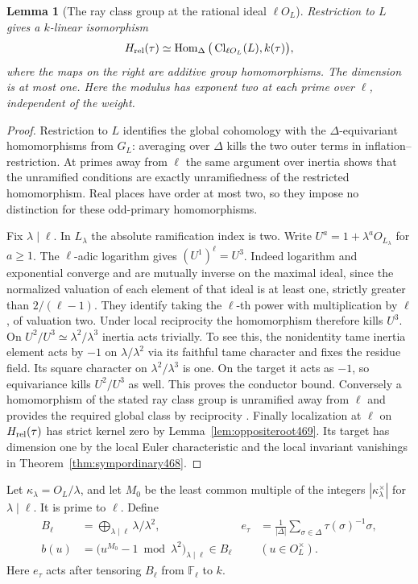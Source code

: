 \documentclass[a4paper,11pt]{article}
\newtheorem{lemma}[proposition]{Lemma}
\theoremstyle{definition}
\theoremstyle{remark}
\numberwithin{equation}{section}
\newcommand{\Cl}{\operatorname{Cl}}
\begin{document}
\begin{lemma}[The ray class group at the rational ideal \(\ell O_L\)]\leavevmode
\label{lem:rayconductor472}
Restriction to \(L\) gives a \(k\)-linear isomorphism
\[
 H_{\rm rel}(\tau)\simeq
   \operatorname{Hom}_{\Delta}\big(\Cl_{\ell O_L}(L),k(\tau)\big),
\]
where the maps on the right are additive group homomorphisms.
The dimension is at most one. Here the modulus has exponent
two at each prime over \(\ell\), independent of the weight.
\end{lemma}
\begin{proof}
Restriction to \(L\) identifies the global cohomology with the
\(\Delta\)-equivariant homomorphisms from \(G_L\): averaging over
\(\Delta\) kills the two outer terms in inflation--restriction.
At primes away from \(\ell\) the same argument over inertia shows
that the unramified conditions are exactly unramifiedness of the
restricted homomorphism. Real places have order at most two, so
they impose no distinction for these odd-primary homomorphisms.

Fix \(\lambda\mid\ell\). In \(L_\lambda\) the absolute
ramification index is two. Write \(U^a=1+\lambda^a O_{L_\lambda}\)
for \(a\ge1\). The \(\ell\)-adic logarithm gives
\((U^1)^\ell=U^3\). Indeed logarithm and exponential converge and
are mutually inverse on the maximal ideal, since the normalized
valuation of each element of that ideal is at least one, strictly
greater than \(2/(\ell-1)\). They identify taking the \(\ell\)-th
power with multiplication by \(\ell\), of valuation two.
Under local reciprocity the homomorphism therefore kills \(U^3\).
On \(U^2/U^3\simeq\lambda^2/\lambda^3\) inertia acts trivially.
To see this, the nonidentity tame inertia element acts by \(-1\)
on \(\lambda/\lambda^2\) via its faithful tame character and
fixes the residue field. Its square character on
\(\lambda^2/\lambda^3\) is one. On the target it acts as \(-1\),
so equivariance kills \(U^2/U^3\) as well. This proves the
conductor bound. Conversely a homomorphism of the stated ray
class group is unramified away from \(\ell\) and provides the
required global class by reciprocity \cite{XI-VIII-rayclass444}. Finally
localization at \(\ell\) on \(H_{\rm rel}(\tau)\) has strict
kernel zero by Lemma~\ref{lem:oppositeroot469}. Its target has
dimension one by the local Euler characteristic and the local
invariant vanishings in Theorem~\ref{thm:sympordinary468}.
\end{proof}

Let \(\kappa_\lambda=O_L/\lambda\), and let \(M_0\) be the least
common multiple of the integers \(|\kappa_\lambda^\times|\) for
\(\lambda\mid\ell\). It is prime to \(\ell\). Define
\[
 \begin{aligned}
 B_\ell&=\bigoplus_{\lambda\mid\ell}\lambda/\lambda^2,
 &e_\tau&=\frac{1}{|\Delta|}\sum_{\sigma\in\Delta}
                                  \tau(\sigma)^{-1}\sigma,\\
 b(u)&=\big(u^{M_0}-1\bmod\lambda^2\big)_{\lambda\mid\ell}
       \in B_\ell &&(u\in O_L^\times).
 \end{aligned}
\]
Here \(e_\tau\) acts after tensoring \(B_\ell\) from \(\mathbb F_\ell\)
to \(k\).
\end{document}
